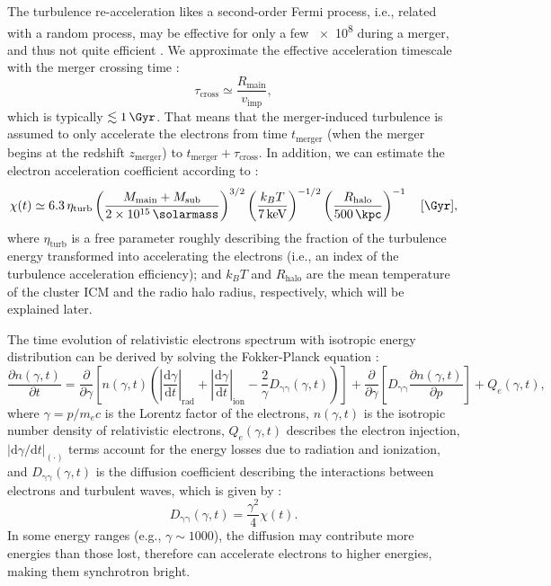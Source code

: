 \documentclass[modern]{aastex61}
\newcommand{\R}[1]{\mathrm{#1}}
\newcommand{\D}[1]{\R{d} #1}
\newcommand{\diff}[2]{\frac{\D{#1}}{\D{#2}}}
\newcommand{\pdiff}[2]{\frac{\partial #1}{\partial #2}}
\begin{document}
The turbulence re-acceleration likes a second-order Fermi process, i.e.,
related with a random process, may be effective for only a few
\SI{e8}{\year} during a merger, and thus not quite efficient
\citep{feretti2012rev,ensslin2011}.
We approximate the effective acceleration timescale with the merger
crossing time \citep{cassano2005}:
\begin{equation}
  \label{eq:tau-cross}
  \tau_{\R{cross}} \simeq \frac{R_{\R{main}}}{v_{\R{imp}}},
\end{equation}
which is typically $\lesssim \SI{1}{\Gyr}$.
That means that the merger-induced turbulence is assumed to only accelerate
the electrons from time $t_{\R{merger}}$ (when the merger begins at the
redshift $z_{\R{merger}}$) to $t_{\R{merger}} + \tau_{\R{cross}}$.
In addition, we can estimate the electron acceleration coefficient
according to \citep{cassano2005}:
\begin{equation}
  \label{eq:electron-acc}
  \chi(t) \simeq 6.3 \,\eta_{\R{turb}}
      \left( \frac{M_{\R{main}} + M_{\R{sub}}}{\SI{2e15}{\solarmass}} \right)^{3/2}
      \left( \frac{k_BT}{\SI{7}{\keV}} \right)^{-1/2}
      \left( \frac{R_{\R{halo}}}{\SI{500}{\kpc}} \right)^{-1}
  \quad [\si{\per\Gyr}],
\end{equation}
where $\eta_{\R{turb}}$ is a free parameter roughly describing the fraction
of the turbulence energy transformed into accelerating the electrons (i.e.,
an index of the turbulence acceleration efficiency);
and $k_BT$ and $R_{\R{halo}}$ are the mean temperature of the cluster ICM
and the radio halo radius, respectively, which will be explained later.

The time evolution of relativistic electrons spectrum with isotropic energy
distribution can be derived by solving the Fokker-Planck equation
\citep{eilek1991,schlickeiser2002}:
\begin{equation}
  \label{eq:fokkerplanck}
  \pdiff{n(\gamma,t)}{t} = \pdiff{}{\gamma} \left[ n(\gamma,t) \left(
      \left| \diff{\gamma}{t} \right|_{\R{rad}} +
      \left| \diff{\gamma}{t} \right|_{\R{ion}} -
      \frac{2}{\gamma} D_{\R{\gamma\gamma}}(\gamma, t) \right) \right] +
  \pdiff{}{\gamma} \left[ D_{\R{\gamma\gamma}} \pdiff{n(\gamma,t)}{p} \right] +
  Q_e(\gamma,t),
\end{equation}
where $\gamma = p / m_e c$ is the Lorentz factor of the electrons,
$n(\gamma, t)$ is the isotropic number density of relativistic
electrons, $Q_e(\gamma, t)$ describes the electron injection,
$|\R{d}\gamma / \R{d}t|_{(\cdot)}$ terms account for the
energy losses due to radiation and ionization,
and $D_{\R{\gamma\gamma}}(\gamma, t)$ is the diffusion coefficient
describing the interactions between electrons and turbulent waves,
which is given by \citep{brunetti2011}:
\begin{equation}
  \label{eq:diffusion-coef}
  D_{\R{\gamma\gamma}}(\gamma, t) = \frac{\gamma^2}{4} \chi(t).
\end{equation}
In some energy ranges (e.g., $\gamma \sim 1000$), the diffusion may
contribute more energies than those lost, therefore can accelerate electrons
to higher energies, making them synchrotron bright.
\end{document}

